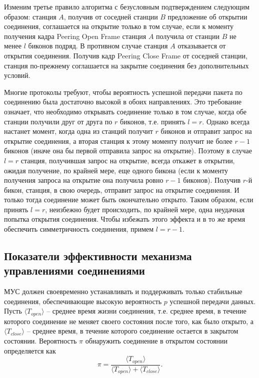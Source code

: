 Изменим третье правило алгоритма с безусловным подтверждением следующим образом: станция $A$, получив от соседней станции $B$ предложение об открытии соединения, соглашается на открытие только в том случае, если к моменту получения кадра Peering Open Frame станция $A$ получила от станции $B$ не менее $l$ биконов подряд. В противном случае станция $A$ отказывается от открытия соединения. Получив кадр Peering Close Frame от соседней станции, станция по-прежнему соглашается на закрытие соединения без дополнительных условий.


Многие протоколы требуют, чтобы вероятность успешной передачи пакета по соединению была достаточно высокой в обоих направлениях.
Это требование означает, что необходимо открывать соединение только в том случае, когда обе станции получили друг от друга по $r$ биконов, т.е. принять $l=r$. Однако всегда настанет момент, когда одна из станций получит $r$ биконов и отправит запрос на открытие соединения, а вторая станция к этому моменту получит не более $r-1$ биконов (иначе она бы первой отправила запрос на открытие). Поэтому в случае $l=r$ станция, получившая запрос на открытие, всегда откажет в открытии, ожидая получение, по крайней мере, еще одного бикона (если к моменту получения запроса на открытие она получила ровно $r-1$ биконов). Получив $r$-й бикон, станция, в свою очередь, отправит запрос на открытие соединения. И только тогда соединение может быть окончательно открыто. Таким образом, если принять $l=r$, неизбежно будет происходить, по крайней мере, одна неудачная попытка открытия соединения. Чтобы избежать этого эффекта и в то же время обеспечить симметричность соединения, примем $l=r-1$. 
%  
%
\subsection{Показатели эффективности механизма управлениями соединениями}

МУС должен своевременно устанавливать и поддерживать только стабильные соединения, обеспечивающие высокую вероятность $p$ успешной передачи данных. Пусть $\langle T_{open} \rangle $ -- среднее время жизни соединения, т.е. среднее время, в течение которого соединение не меняет своего состояния после того, как было открыто, а $\langle T_{close} \rangle$ -- среднее время, в течение которого соединение остается в закрытом состоянии. Вероятность $\pi$ обнаружить соединение в открытом состоянии определяется как
\begin{equation}
\label{eq:task:pi-formula}
\pi = \frac{\langle T_{open} \rangle}{\langle T_{open} \rangle + \langle T_{close} \rangle}.
\end{equation}


